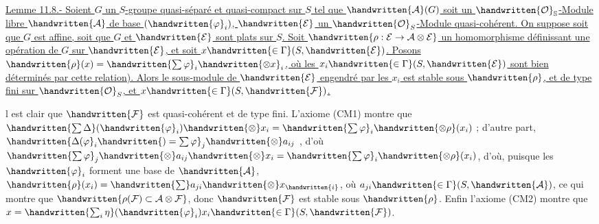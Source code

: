 \uline{Lemme 11.8.- Soient $G$ un $S$-groupe quasi-séparé et quasi-compact sur $S$ tel que $\handwritten{\mathcal{A}}(G)$ soit un $\handwritten{\mathcal{O}}_{\mathbb{S}}$-Module  libre $\handwritten{\mathcal{A}}$ de base $(\handwritten{\varphi}_i)$, $\handwritten{\mathcal{E}}$ un $\handwritten{\mathcal{O}}_S$-Module quasi-cohérent. On suppose soit que $G$ est affine, soit que $G$ et $\handwritten{\mathcal{E}}$ sont plats sur $S$. Soit $\handwritten{\rho:\mathcal{E}\to\mathcal{A}\otimes\mathcal{E}}$ un homomorphisme définissant une opération de $G$ sur $\handwritten{\mathcal{E}}$, et soit $x\handwritten{\in\Gamma}(S,\handwritten{\mathcal{E}})$. Posons $\handwritten{\rho}(x)=\handwritten{\sum\varphi}_i\handwritten{\otimes x}_i$, où les $x_i\handwritten{\in\Gamma}(S,\handwritten{\mathcal{E}})$ sont bien déterminés par cette relation). Alors le sous-module de $\handwritten{\mathcal{E}}$ engendré par les $x_i$ est stable sous $\handwritten{\rho}$, et de type fini sur $\handwritten{\mathcal{O}}_S$, et $x\handwritten{\in\Gamma}(S,\handwritten{\mathcal{F}})$.}

 l est clair que $\handwritten{\mathcal{F}}$ est quasi-cohérent et de type fini. L'axiome (CM1) montre que $\handwritten{\sum\Delta}(\handwritten{\varphi}_i)\handwritten{\otimes}x_i=\handwritten{\sum\varphi}_i\handwritten{\otimes\rho}(x_i)$ ; d'autre part, $\handwritten{\Delta(\varphi}_i\handwritten{)=\sum\varphi}_j\handwritten{\otimes}a_{ij}$ , d'où $\handwritten{\sum\varphi}_j\handwritten{\otimes}a_{ij}\handwritten{\otimes}x_i=\handwritten{\sum\varphi}_i\handwritten{\otimes\rho}(x_i)$, d'où, puisque les $\handwritten{\varphi}_i$ forment une base de $\handwritten{\mathcal{A}}$, $\handwritten{\rho}(x_i)=\handwritten{\sum}a_{ji}\handwritten{\otimes}x_{\handwritten{i}}$, où $a_{ji}\handwritten{\in\Gamma}(S,\handwritten{\mathcal{A}})$, ce qui montre que $\handwritten{\rho(\mathcal{F})\subset\mathcal{A}\otimes\mathcal{F}}$, donc $\handwritten{\mathcal{F}}$ est stable sous $\handwritten{\rho}$. Enfin l'axiome (CM2) montre que $x=\handwritten{\sum_i\eta}(\handwritten{\varphi}_i)x_i\handwritten{\in\Gamma}(S,\handwritten{\mathcal{F}})$.

